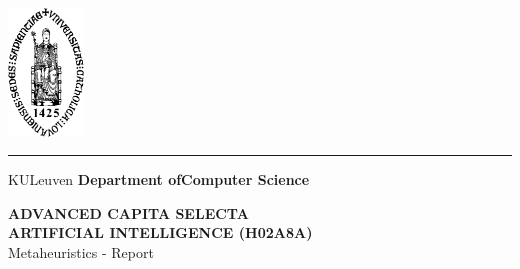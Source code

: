 \begin{titlepage}
    \newpage
    \thispagestyle{empty}
    \frenchspacing
    \hspace{-0.2cm}
    \includegraphics[height=3.4cm]{sedes}
    \hspace{0.2cm}
    \rule{0.5pt}{3.4cm}
    \hspace{0.2cm}
    \begin{minipage}[b]{8cm}
        \Large{KULeuven}\smallskip\newline
        \large{}\smallskip\newline
        \textbf{Department of\newline Computer Science}\smallskip
    \end{minipage}
    \vspace*{3.2cm}\vfill
    \begin{center}
        \begin{minipage}[t]{\textwidth}
            \begin{center}
                \LARGE{\rm{\textbf{\uppercase{Advanced Capita Selecta \\ Artificial Intelligence (H02A8a)}}}}\\
                \Large{\rm{Metaheuristics - Report}}
            \end{center}
        \end{minipage}
    \end{center}
    \vfill
    \hfill{}
\end{titlepage}
